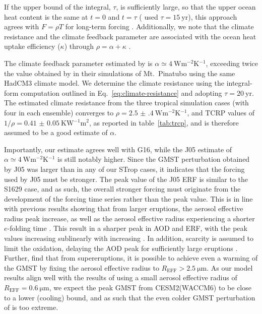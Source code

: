 \documentclass[draft]{agujournal2019}
\begin{document}
  If the upper bound of the integral, \(\tau\), is sufficiently large, so that the upper
  ocean heat content is the same at \(t=0\) and \(t=\tau\) ( used
  \(\tau =\SI{15}{\mathrm{yr}}\)), this approach agrees with \(F=\rho T\) for long-term
  forcing \cite{gregory2016}. Additionally, we note that the climate resistance and the
  climate feedback parameter are associated with the ocean heat uptake efficiency
  (\(\kappa\)) through \(\rho =\alpha +\kappa\) \cite{gregory2016}.

  The climate feedback parameter estimated by  is \(\alpha \simeq
  \SI{4}{\watt\metre^{-2}\kelvin^{-1}}\), exceeding twice the value obtained by
   in their simulations of Mt.\ Pinatubo using the same HadCM3
  climate model. We determine the climate resistance using the integral-form computation
  outlined in Eq.~\ref{eq:climate-resistance} and adopting \(\tau
  =\SI{20}{\mathrm{yr}}\). The estimated climate resistance from the three tropical
  simulation cases (with four in each ensemble) converges to \(\rho
  =\SI{2.5(4)}{\watt\metre^{-2}\kelvin^{-1}}\), and TCRP values of
  \(1/\rho=\SI{0.41(5)}{\kelvin\watt^{-1}\metre^{2}}\), as reported in
  table~\ref{tab:trcp}, and is therefore assumed to be a good estimate of \(\alpha\).

  Importantly, our estimate agrees well with G16, while the J05 estimate of \(\alpha
  \simeq \SI{4}{\watt\metre^{-2}\kelvin^{-1}}\) is still notably higher. Since the GMST
  perturbation obtained by J05 was larger than in any of our STrop cases, it indicates
  that the forcing used by J05 must be stronger. The peak value
  of the J05 ERF is similar to the S1629 case, and as such, the overall stronger forcing
  must originate from the development of the forcing time series rather than the peak
  value. This is in line with previous results showing that from larger eruptions, the
  aerosol effective radius peak increase, as well as the aerosol effective radius
  experiencing a shorter \(e\)-folding time \cite{clyne2021}. This result in a sharper
  peak in AOD and ERF, with the peak values increasing sublinearly with increasing
   \cite{english2013,timmreck2009,zanchettin2016,clyne2021}. In addition,
   scarcity is assumed to limit the  oxidation, delaying the AOD peak for
  sufficiently large eruptions \cite{timmreck2010}. Further,  find
  that from supereruptions, it is possible to achieve even a warming of the GMST by
  fixing the aerosol effective radius to \(R_{\mathrm{EFF}}>\SI{2.5}{\micro\meter}\). As
  our model results align well with the results of  using a small
  aerosol effective radius of \(R_{\mathrm{EFF}}=\SI{0.6}{\micro\meter}\), we expect the
  peak GMST from CESM2(WACCM6) to be close to a lower (cooling) bound, and as such that
  the even colder GMST perturbation of  is too extreme.
\end{document}
